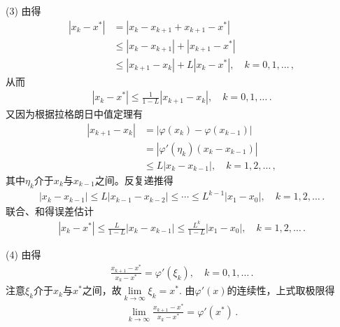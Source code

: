 \begin{prove}
    (3) 由得
    \begin{align}\label{eq:02ex0316}
        |x_k-x^*| & =|x_k-x_{k+1}+x_{k+1}-x^*|\nonumber                \\
                  & \le|x_k-x_{k+1}|+|x_{k+1}-x^*|\nonumber            \\
                  & \le|x_{k+1}-x_k|+L|x_k-x^*|,\quad k=0,1,\ldots\, ,
    \end{align}
    从而
    \begin{align}\label{eq:02ex0317}
        |x_k-x^*|\le\frac{1}{1-L}|x_{k+1}-x_k|,\quad k=0,1,\ldots\, .
    \end{align}
    又因为根据拉格朗日中值定理有
    \begin{align}\label{eq:02ex0318}
        |x_{k+1}-x_k| & =|\varphi(x_k)-\varphi(x_{k-1})|\nonumber \\
                      & =|\varphi'(\eta_k)(x_k-x_{k-1})|\nonumber \\
                      & \le L|x_k-x_{k-1}|,\quad k=1,2,\ldots\, ,
    \end{align}
    其中$\eta_k$介于$x_k$与$x_{k-1}$之间。反复递推得
    \begin{align}\label{eq:02ex0319}
        |x_k-x_{k-1}|\le L |x_{k-1}-x_{k-2}|\le\cdots\le L^{k-1}|x_1-x_0|,\quad k=1,2,\ldots\, .
    \end{align}
    联合、和得误差估计
    \begin{align}\label{eq:02ex0320}
        |x_k-x^*|\le\frac{L}{1-L}|x_k-x_{k-1}|\le\frac{L^k}{1-L}|x_1-x_0|,\quad k=1,2,\ldots\, .
    \end{align}

    (4) 由得
    \begin{align}\label{eq:02ex0321}
        \frac{x_{k+1}-x^*}{x_k-x^*}=\varphi'(\xi_k),\quad k=0,1,\ldots\, .
    \end{align}
    注意$\xi_k$介于$x_k$与$x^*$之间，故$\displaystyle\lim\limits_{k\rightarrow\infty}{\xi_k}=x^*$.
    由$\varphi'(x)$的连续性，上式取极限得
    \begin{align}\label{eq:02ex0322}
        \lim\limits_{k\rightarrow\infty}{\frac{x_{k+1}-x^*}{x_k-x^*}}=\varphi'(x^*)\, .
    \end{align}
\end{prove}

